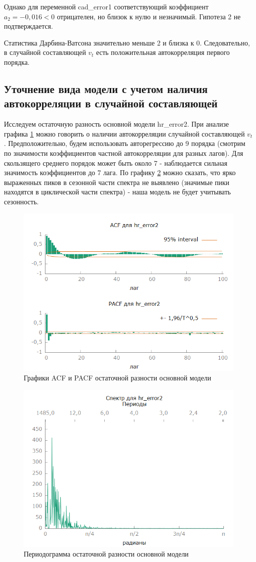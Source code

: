 \documentclass[a4paper,12pt]{article}
\begin{document}
Однако для переменной cad\_error1 соответствующий коэффициент $a_2 = -0,016 < 0$ отрицателен, но близок к нулю и незначимый. Гипотеза 2 не подтверждается.

Статистика Дарбина-Ватсона значительно меньше 2 и близка к 0. Следовательно, в случайной составляющей $v_t$ есть положительная автокорреляция первого порядка.

\subsection{Уточнение вида модели с учетом наличия автокорреляции в случайной составляющей}
Исследуем остаточную разность основной модели hr\_error2. При анализе графика \ref{fig:hr_error2_acf_100} можно говорить о наличии автокорреляции случайной составляющей $v_t$. Предположительно, будем использовать авторегрессию до 9 порядка (смотрим по значимости коэффициентов частной автокорреляции для разных лагов). Для скользящего среднего порядок может быть около 7 - наблюдается сильная значимость коэффициентов до 7 лага. По графику \ref{fig:hr_error2_spectr} можно сказать, что ярко выраженных пиков в сезонной части спектра не выявлено (значимые пики находятся в циклической части спектра) - наша модель не будет учитывать сезонность. 

\begin{figure}[H]
	\centering
	\includegraphics[width=0.5\linewidth]{../[graphics]/hr_error2_acf_100.png}
	\caption{Графики ACF и PACF остаточной разности основной модели}
	\label{fig:hr_error2_acf_100}
\end{figure}

\begin{figure}[H]
	\centering
	\includegraphics[width=0.5\linewidth]{../[graphics]/hr_error2_spectr.png}
	\caption{Периодограмма остаточной разности основной модели}
	\label{fig:hr_error2_spectr}
\end{figure}
\end{document}
